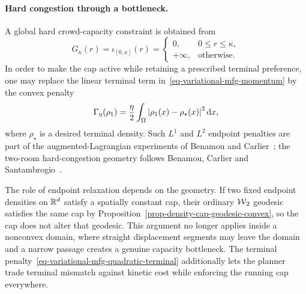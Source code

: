 \paragraph{Hard congestion through a bottleneck.}
A global hard crowd-capacity constraint is obtained from
\begin{equation}\label{eq-variational-mfg-hard-cap}
	G_\kappa(r)=\iota_{[0,\kappa]}(r)
	=
	\begin{cases}
		0,&0\leq r\leq\kappa,\\
		+\infty,&\text{otherwise}.
	\end{cases}
\end{equation}
In order to make the cap active while retaining a prescribed terminal preference, one may replace the linear terminal term in~\eqref{eq-variational-mfg-momentum} by the convex penalty
\begin{equation}\label{eq-variational-mfg-quadratic-terminal}
	\Gamma_\eta(\rho_1)
	=
	\frac{\eta}{2}
	\int_\Omega\left\lvert\rho_1(x)-\rho_\star(x)\right\rvert^2\mathrm{d} x,
\end{equation}
where $\rho_\star$ is a desired terminal density. Such $L^1$ and $L^2$ endpoint penalties are part of the augmented-Lagrangian experiments of Benamou and Carlier~\cite{benamou2015augmented}; the two-room hard-congestion geometry follows Benamou, Carlier and Santambrogio~\cite{BenamouCarlierSantambrogio2017}.

The role of endpoint relaxation depends on the geometry. If two fixed endpoint densities on $\mathbb{R}^d$ satisfy a spatially constant cap, their ordinary $\operatorname{\mathcal{W}}_2$ geodesic satisfies the same cap by Proposition~\ref{prop-density-cap-geodesic-convex}, so the cap does not alter that geodesic. This argument no longer applies inside a nonconvex domain, where straight displacement segments may leave the domain and a narrow passage creates a genuine capacity bottleneck. The terminal penalty~\eqref{eq-variational-mfg-quadratic-terminal} additionally lets the planner trade terminal mismatch against kinetic cost while enforcing the running cap everywhere.

